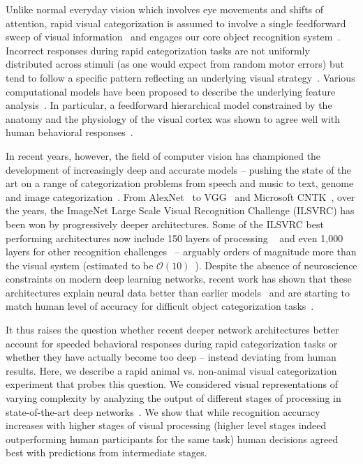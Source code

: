 \documentclass{article}
\begin{document}
\enlargethispage{5mm}


Unlike normal everyday vision which involves eye movements and shifts of attention, rapid visual categorization is assumed to involve a single feedforward sweep of visual information~\citep[see][for review]{VanRullen2007} and engages our core object recognition system~\citep[reviewed in][]{DiCarlo2012}. Incorrect responses during rapid categorization tasks are not uniformly distributed across stimuli (as one would expect from random motor errors) but tend to follow a specific pattern reflecting an underlying visual strategy~\citep{Cauchoix2016}. Various computational models have been proposed to describe the underlying feature analysis~\citep[see][for review]{Crouzet2011}. In particular, a feedforward hierarchical model constrained by the anatomy and the physiology of the visual cortex was shown to agree well with human behavioral responses~\citep{Serre2007}. 
 
In recent years, however, the field of computer vision has championed the development of increasingly deep and accurate models -- pushing the state of the art on a range of categorization problems from speech and music to text, genome and image categorization~\citep[see][for a recent review]{LeCun2015}. From AlexNet~\citep{Krizhevsky2012} to VGG~\citep{Simonyan2014a} and Microsoft CNTK~\citep{He2015a}, over the years, the ImageNet Large Scale Visual Recognition Challenge (ILSVRC) has been won by progressively deeper architectures. Some of the ILSVRC best performing architectures now include 150 layers of processing ~\citep{He2015a} and even 1,000 layers for other recognition challenges~\citep{HeZR016} -- arguably orders of magnitude more than the visual system (estimated to be $\mathcal O(10)$~\citep{Serre2007}). Despite the absence of neuroscience constraints on modern deep learning networks, recent work has shown that these architectures explain neural data better than earlier models~\citep[reviewed in][]{Yamins2016} and are starting to match human level of accuracy for difficult object categorization tasks~\citep{He2015a}. 


It thus raises the question whether recent deeper network architectures better account for speeded behavioral responses during rapid categorization tasks or whether they have actually become too deep -- instead deviating from human results. Here, we describe a rapid animal vs. non-animal visual categorization experiment that probes this question. We considered visual representations of varying complexity by analyzing the output of different stages of processing in state-of-the-art deep networks~\citep{Krizhevsky2012, Simonyan2014a}. We show that while recognition accuracy increases with higher stages of visual processing (higher level stages indeed outperforming human participants for the same task) human decisions agreed best with predictions from intermediate stages. 
\end{document}
